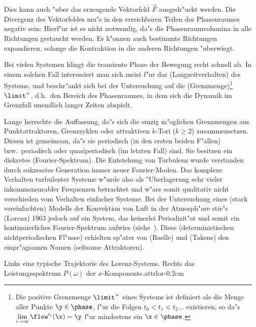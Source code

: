 Dies kann auch "uber das erzeugende Vektorfeld $\vec F$ ausgedr"uckt werden. Die Divergenz
des Vektorfeldes mu"s in den erreichbaren Teilen des Phasenraumes negativ sein:
Hierf"ur ist es nicht notwendig, da"s die Phasenraumvolumina in alle Richtungen gestaucht
werden. Es k"onnen auch bestimmte Richtungen expandieren, solange die Kontraktion in
die anderen Richtungen "uberwiegt.

Bei vielen Systemen klingt die transiente Phase der Bewegung recht schnell ab. In einem solchen
Fall interessiert man sich meist f"ur das \begriff(Langzeitverhalten) des Systems, und
beschr"ankt sich bei der Untersuchung auf die \begriff(Grenzmenge)\footnote{Die positive
  Grenzmenge $\limit^+$ eines Systems ist definiert als die Menge aller Punkte $\y\in\phase$, f"ur
  die Folgen $t_0\lt t_1\lt t_2\dots$ existieren, so da"s
  $\lim\limits_{i\to\infty}\flow^{t_i}(\x)=\y$ f"ur mindestens ein $\x\in\phase$.}
$\limit^+$, d.h.\ den Bereich des Phasenraumes, in dem sich die Dynamik im Grenzfall
unendlich langer Zeiten abspielt.

Lange herrschte die Auffassung, da"s sich die einzig m"oglichen Grenzmengen aus
Punkt\-attraktoren, Grenzzyklen oder attraktiven $k$-Tori ($k\geq2$) zusammensetzen.
Diesen ist gemeinsam, da"s sie periodisch (in den ersten beiden F"allen) bzw.\ periodisch
oder quasiperiodisch (im letzten Fall) sind. Sie besitzen ein diskretes
\begriff(Fourier-Spektrum).  Die Entstehung von Turbulenz wurde verstanden durch
sukzessive Generation immer neuer Fourier-Moden.  Das komplexe Verhalten turbulenter
Systeme w"urde also als "Uberlagerung sehr vieler inkommensurabler Frequenzen betrachtet
und w"are somit qualitativ nicht verschieden vom Verhalten einfacher Systeme. Bei der
Untersuchung eines (stark vereinfachten) Modells der Konvektion von Luft in der
Atmosph"are stie"s \autor(Lorenz) 1963 \cite{Lorenz63} jedoch auf ein System, das
keinerlei Periodizit"at und somit ein kontinuierliches Fourier-Spektrum aufwies
(siehe~). Diese \begriff(deterministischen nichtperiodischen Fl"usse)
erhielten sp"ater von \autor(Ruelle) und \autor(Takens) \cite{Ruelle71a} den
einpr"agsamen Namen \begriff(seltsame Attraktoren).


{Links eine typische Trajektorie des Lorenz-Systems.  Rechts das Leistungsspektrum $P(\omega)$ der 
$x$-Komponente.}{attrlor}{-0.2cm}

